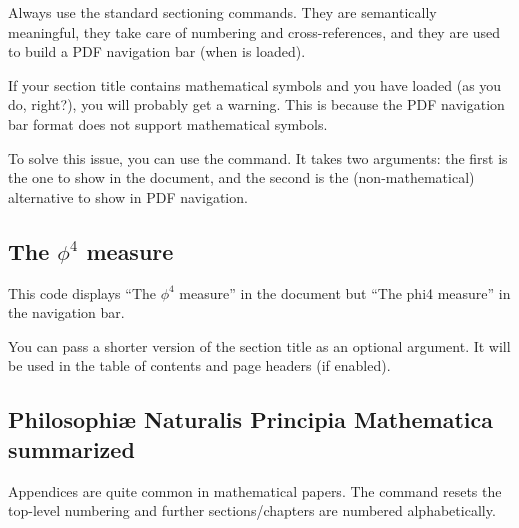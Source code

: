 \begin{practices}
Always use the standard sectioning commands.
They are semantically meaningful,
they take care of numbering and cross-references,
and they are used to build a PDF navigation bar (when  is loaded).
\end{practices}

\begin{gotcha}
If your section title contains mathematical symbols
and you have  loaded (as you do, right?),
you will probably get a warning.
This is because the PDF navigation bar format does not support mathematical symbols.

To solve this issue, you can use the  command.
It takes two arguments: the first is the one to show in the document,
and the second is the (non-mathematical) alternative to show in PDF navigation.
\begin{ExampleCode}
\section{The \texorpdfstring{$\phi^4$}{phi4} measure}
\end{ExampleCode}
This code displays ``The $\phi^4$ measure'' in the document
but ``The phi4 measure'' in the navigation bar.
\end{gotcha}

You can pass a shorter version of the section title as an optional argument.
It will be used in the table of contents and page headers (if enabled).
\begin{ExampleCode}
\section[Principia summarized]{Philosophi\ae{} Naturalis
                               Principia Mathematica summarized}
\end{ExampleCode}

Appendices are quite common in mathematical papers.
The  command resets the top-level numbering
and further sections/chapters are numbered alphabetically.

